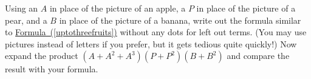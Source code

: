 \documentclass{book}
\begin{document}
\setcounter{cpjt}{236}
\addtocounter{cpjt}{-1}
\begin{activity}\label{twopiecesoffruit}
\hypertarget{p-1255}{}%
Using an \(A\) in place of the picture of an apple, a \(P\) in place of the picture of a pear, and a \(B\) in place of the picture of a banana, write out the formula similar to \hyperref[uptothreefruits]{Formula~(\ref{uptothreefruits})} without any dots for left out terms. (You may use pictures instead of letters if you prefer, but it gets tedious quite quickly!) Now expand the product \((A+A^2+A^3)(P+P^2)(B+B^2)\) and compare the result with your formula.%
\par\smallskip%
\noindent\end{activity}

\clearpage
\end{document}
